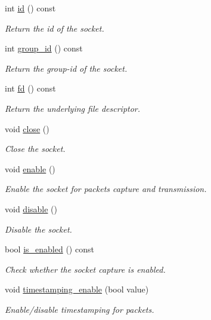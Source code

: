 \begin{DoxyCompactItemize}
int \hyperlink{classpfq_1_1socket_a78e4376b28f6eef5b126018197522d30}{id} () const
\begin{DoxyCompactList}\small\item\em Return the id of the socket. \end{DoxyCompactList}\item 
int \hyperlink{classpfq_1_1socket_a469d06a58cfbe1a24893ce619218d536}{group\+\_\+id} () const
\begin{DoxyCompactList}\small\item\em Return the group-\/id of the socket. \end{DoxyCompactList}\item 
int \hyperlink{classpfq_1_1socket_a159189ab268469b3a6c438747a5bbb8c}{fd} () const
\begin{DoxyCompactList}\small\item\em Return the underlying file descriptor. \end{DoxyCompactList}\item 
void \hyperlink{classpfq_1_1socket_a4c179188ea8fceeb5fd47d52f93c6bda}{close} ()
\begin{DoxyCompactList}\small\item\em Close the socket. \end{DoxyCompactList}\item 
void \hyperlink{classpfq_1_1socket_a5b25af762946405695f4192b08c04146}{enable} ()
\begin{DoxyCompactList}\small\item\em Enable the socket for packets capture and transmission. \end{DoxyCompactList}\item 
void \hyperlink{classpfq_1_1socket_ac7e918bff7d1672125a8549dae750dcc}{disable} ()
\begin{DoxyCompactList}\small\item\em Disable the socket. \end{DoxyCompactList}\item 
bool \hyperlink{classpfq_1_1socket_af414e42b71611f6c8ed44c9e7f57ff41}{is\+\_\+enabled} () const
\begin{DoxyCompactList}\small\item\em Check whether the socket capture is enabled. \end{DoxyCompactList}\item 
void \hyperlink{classpfq_1_1socket_a39457556d11f22b1266abc8f9f7c46bd}{timestamping\+\_\+enable} (bool value)
\begin{DoxyCompactList}\small\item\em Enable/disable timestamping for packets. \end{DoxyCompactList}\item 

\end{DoxyCompactItemize}
